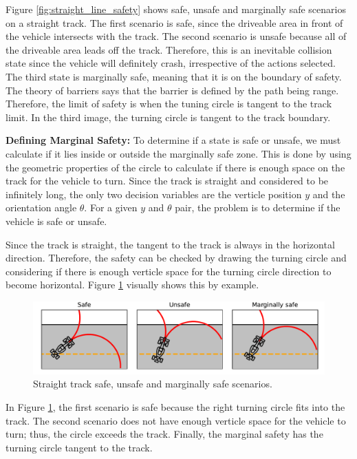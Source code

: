 \documentclass[letterpaper, 10 pt, conference]{ieeeconf}  %
\begin{document}
Figure \ref{fig:straight_line_safety} shows safe, unsafe and marginally safe scenarios on a straight track.
The first scenario is safe, since the driveable area in front of the vehicle intersects with the track.
The second scenario is unsafe because all of the driveable area leads off the track. 
Therefore, this is an inevitable collision state since the vehicle will definitely crash, irrespective of the actions selected.
The third state is marginally safe, meaning that it is on the boundary of safety.
The theory of barriers says that the barrier is defined by the path being range.
Therefore, the limit of safety is when the tuning circle is tangent to the track limit.
In the third image, the turning circle is tangent to the track boundary.

\textbf{Defining Marginal Safety:}
To determine if a state is safe or unsafe, we must calculate if it lies inside or outside the marginally safe zone.
This is done by using the geometric properties of the circle to calculate if there is enough space on the track for the vehicle to turn.
Since the track is straight and considered to be infinitely long, the only two decision variables are the verticle position $y$ and the orientation angle $\theta$.
For a given $y$ and $\theta$ pair, the problem is to determine if the vehicle is safe or unsafe.

Since the track is straight, the tangent to the track is always in the horizontal direction.
Therefore, the safety can be checked by drawing the turning circle and considering if there is enough verticle space for the turning circle direction to become horizontal.
Figure \ref{fig:tangent_circles} visually shows this by example.


\begin{figure}[h]
    \centering
    \includegraphics[width=\linewidth]{Imgs/tangent_circles.pdf}
    \caption{Straight track safe, unsafe and marginally safe scenarios.}
    \label{fig:tangent_circles}
\end{figure}

In Figure \ref{fig:tangent_circles}, the first scenario is safe because the right turning circle fits into the track.
The second scenario does not have enough verticle space for the vehicle to turn; thus, the circle exceeds the track.
Finally, the marginal safety has the turning circle tangent to the track.
\end{document}
